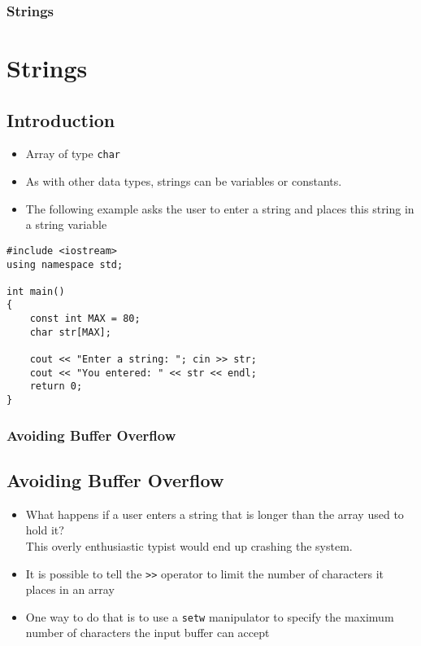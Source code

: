 \documentclass{beamer}
\begin{document}
\begin{frame}[fragile]\frametitle{Strings}
    \section{Strings} %
    \label{sec:strings}
    \subsection{Introduction} %
    \label{sub:introduction}
    \begin{itemize}
        \item Array of type \texttt{char}
        \item As with other data types, strings can be variables or constants.
        \item The following example asks the user to enter a string and places this string in a string variable
    \end{itemize}
    \lstset{style=mystyle}
    \begin{lstlisting}
#include <iostream>
using namespace std;

int main()
{
    const int MAX = 80;
    char str[MAX];

    cout << "Enter a string: "; cin >> str;
    cout << "You entered: " << str << endl;
    return 0;
}
\end{lstlisting}
\end{frame}

\begin{frame}\frametitle{Avoiding Buffer Overflow}
    \subsection{Avoiding Buffer Overflow} %
    \label{sub:avoiding_buffer_overflow}
    \begin{itemize}
        \item What happens if a user enters a string that is longer than the array used to hold it? \\
        This overly enthusiastic typist would end up crashing the system.
        \item It is possible to tell the \texttt{>>} operator to limit the number of characters it places in an array
        \item One way to do that is to use a \texttt{setw} manipulator to specify the maximum number of characters the input buffer can accept
    \end{itemize}
\end{frame}
\end{document}
